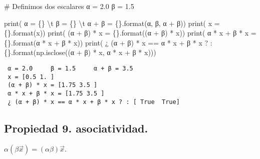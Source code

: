 \documentclass[
  letterpaper,
  DIV=11,
  numbers=noendperiod]{scrreprt}
\newenvironment{Shaded}{\begin{snugshade}}{\end{snugshade}}
\newcommand{\BuiltInTok}[1]{\textcolor[rgb]{0.00,0.23,0.31}{#1}}
\newcommand{\CharTok}[1]{\textcolor[rgb]{0.13,0.47,0.30}{#1}}
\newcommand{\CommentTok}[1]{\textcolor[rgb]{0.37,0.37,0.37}{#1}}
\newcommand{\FloatTok}[1]{\textcolor[rgb]{0.68,0.00,0.00}{#1}}
\newcommand{\NormalTok}[1]{\textcolor[rgb]{0.00,0.23,0.31}{#1}}
\newcommand{\OperatorTok}[1]{\textcolor[rgb]{0.37,0.37,0.37}{#1}}
\newcommand{\SpecialCharTok}[1]{\textcolor[rgb]{0.37,0.37,0.37}{#1}}
\newcommand{\StringTok}[1]{\textcolor[rgb]{0.13,0.47,0.30}{#1}}
\begin{document}
\begin{Shaded}
\begin{Highlighting}[]
\CommentTok{\# Definimos dos escalares}
\NormalTok{α }\OperatorTok{=} \FloatTok{2.0}
\NormalTok{β }\OperatorTok{=} \FloatTok{1.5}

\BuiltInTok{print}\NormalTok{(}\StringTok{\textquotesingle{} α = }\SpecialCharTok{\{\}}\StringTok{ }\CharTok{\textbackslash{}t}\StringTok{ β = }\SpecialCharTok{\{\}}\StringTok{ }\CharTok{\textbackslash{}t}\StringTok{ α + β = }\SpecialCharTok{\{\}}\StringTok{\textquotesingle{}}\NormalTok{.}\BuiltInTok{format}\NormalTok{(α, β, α }\OperatorTok{+}\NormalTok{ β))}
\BuiltInTok{print}\NormalTok{(}\StringTok{\textquotesingle{} x = }\SpecialCharTok{\{\}}\StringTok{\textquotesingle{}}\NormalTok{.}\BuiltInTok{format}\NormalTok{(x))}
\BuiltInTok{print}\NormalTok{(}\StringTok{\textquotesingle{} (α + β) * x = }\SpecialCharTok{\{\}}\StringTok{\textquotesingle{}}\NormalTok{.}\BuiltInTok{format}\NormalTok{((α }\OperatorTok{+}\NormalTok{ β) }\OperatorTok{*}\NormalTok{ x))}
\BuiltInTok{print}\NormalTok{(}\StringTok{\textquotesingle{} α * x + β * x = }\SpecialCharTok{\{\}}\StringTok{\textquotesingle{}}\NormalTok{.}\BuiltInTok{format}\NormalTok{(α }\OperatorTok{*}\NormalTok{ x }\OperatorTok{+}\NormalTok{ β }\OperatorTok{*}\NormalTok{ x))}
\BuiltInTok{print}\NormalTok{(}\StringTok{\textquotesingle{} ¿ (α + β) * x == α * x + β * x ? : }\SpecialCharTok{\{\}}\StringTok{\textquotesingle{}}\NormalTok{.}\BuiltInTok{format}\NormalTok{(np.isclose((α }\OperatorTok{+}\NormalTok{ β) }\OperatorTok{*}\NormalTok{ x, α }\OperatorTok{*}\NormalTok{ x }\OperatorTok{+}\NormalTok{ β }\OperatorTok{*}\NormalTok{ x)))}
\end{Highlighting}
\end{Shaded}

\begin{verbatim}
 α = 2.0     β = 1.5     α + β = 3.5
 x = [0.5 1. ]
 (α + β) * x = [1.75 3.5 ]
 α * x + β * x = [1.75 3.5 ]
 ¿ (α + β) * x == α * x + β * x ? : [ True  True]
\end{verbatim}

\subsection{Propiedad 9.
asociatividad.}\label{propiedad-9.-asociatividad.}

\(\alpha (\beta \vec{x}) = (\alpha \beta) \vec{x}\).
\end{document}
